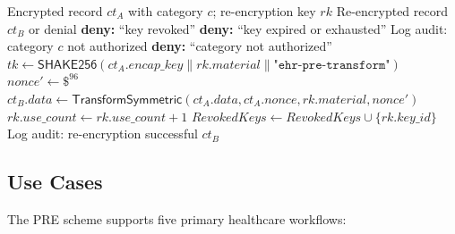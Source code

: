 \documentclass[conference,10pt]{IEEEtran}
\newcommand{\shake}{\textsf{SHAKE256}}
\begin{document}
\begin{algorithm}[htbp]
\caption{Proxy Re-Encryption with Consent Enforcement}
\label{alg:reenc}
\begin{algorithmic}[1]
\REQUIRE Encrypted record $\mathit{ct}_A$ with category $c$; re-encryption key $\mathit{rk}$
\ENSURE Re-encrypted record $\mathit{ct}_B$ or denial
    \STATE \textbf{deny:} ``key revoked''
\ENDIF
{}
    \STATE \textbf{deny:} ``key expired or exhausted''
\ENDIF
{}
    \STATE Log audit: category $c$ not authorized
    \STATE \textbf{deny:} ``category not authorized''
\ENDIF
\STATE $\mathit{tk} \leftarrow \shake{}(\mathit{ct}_A.\mathit{encap\_key} \| \mathit{rk}.\mathit{material} \| \texttt{"ehr-pre-transform"})$
\STATE $\mathit{nonce}' \leftarrow \$^{96}$
\STATE $\mathit{ct}_B.\mathit{data} \leftarrow \mathsf{TransformSymmetric}(\mathit{ct}_A.\mathit{data}, \mathit{ct}_A.\mathit{nonce}, \mathit{rk}.\mathit{material}, \mathit{nonce}')$
\STATE $\mathit{rk}.\mathit{use\_count} \leftarrow \mathit{rk}.\mathit{use\_count} + 1$
    \STATE $\mathit{RevokedKeys} \leftarrow \mathit{RevokedKeys} \cup \{\mathit{rk}.\mathit{key\_id}\}$
\ENDIF
\STATE Log audit: re-encryption successful
\RETURN $\mathit{ct}_B$
\end{algorithmic}
\end{algorithm}

\subsection{Use Cases}

The PRE scheme supports five primary healthcare workflows:
\end{document}
